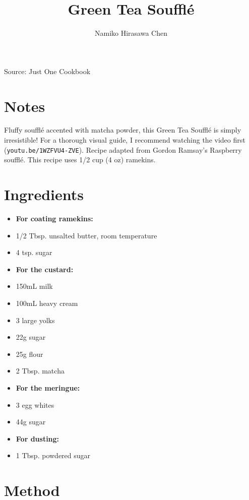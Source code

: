 \documentclass[12pt]{article}
\author{Namiko Hirasawa Chen}
\title{Green Tea Soufflé}
\date{}
\begin{document}
\begin{multicols*}{2}
\maketitle

Source: Just One Cookbook

\section{Notes}

Fluffy soufflé accented with matcha powder, this Green Tea Soufflé is simply irresistible! For a thorough visual guide, I recommend watching the video first (\texttt{youtu.be/1WZFVU4-ZVE}). Recipe adapted from Gordon Ramsay's Raspberry soufflé. This recipe uses 1/2 cup (4 oz) ramekins.

\section{Ingredients}

\begin{itemize}
    \item \textbf{For coating ramekins:}
    \item 1/2 Tbsp. unsalted butter, room temperature
    \item 4 tsp. sugar
    \item \textbf{For the custard:}
    \item 150mL milk
    \item 100mL heavy cream
    \item 3 large yolks
    \item 22g sugar
    \item 25g flour
    \item 2 Tbsp. matcha
    \item \textbf{For the meringue:}
    \item 3 egg whites
    \item 44g sugar
    \item \textbf{For dusting:}
    \item 1 Tbsp. powdered sugar
\end{itemize}

\section{Method}


\end{multicols*}
\end{document}

